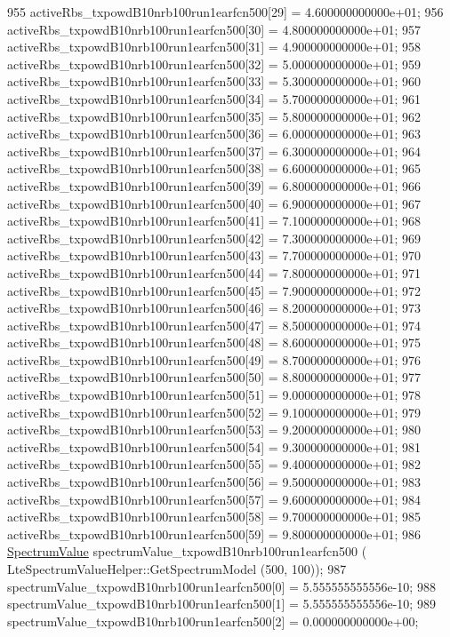 \begin{DoxyCode}
955   activeRbs\_txpowdB10nrb100run1earfcn500[29] = 4.600000000000e+01;
956   activeRbs\_txpowdB10nrb100run1earfcn500[30] = 4.800000000000e+01;
957   activeRbs\_txpowdB10nrb100run1earfcn500[31] = 4.900000000000e+01;
958   activeRbs\_txpowdB10nrb100run1earfcn500[32] = 5.000000000000e+01;
959   activeRbs\_txpowdB10nrb100run1earfcn500[33] = 5.300000000000e+01;
960   activeRbs\_txpowdB10nrb100run1earfcn500[34] = 5.700000000000e+01;
961   activeRbs\_txpowdB10nrb100run1earfcn500[35] = 5.800000000000e+01;
962   activeRbs\_txpowdB10nrb100run1earfcn500[36] = 6.000000000000e+01;
963   activeRbs\_txpowdB10nrb100run1earfcn500[37] = 6.300000000000e+01;
964   activeRbs\_txpowdB10nrb100run1earfcn500[38] = 6.600000000000e+01;
965   activeRbs\_txpowdB10nrb100run1earfcn500[39] = 6.800000000000e+01;
966   activeRbs\_txpowdB10nrb100run1earfcn500[40] = 6.900000000000e+01;
967   activeRbs\_txpowdB10nrb100run1earfcn500[41] = 7.100000000000e+01;
968   activeRbs\_txpowdB10nrb100run1earfcn500[42] = 7.300000000000e+01;
969   activeRbs\_txpowdB10nrb100run1earfcn500[43] = 7.700000000000e+01;
970   activeRbs\_txpowdB10nrb100run1earfcn500[44] = 7.800000000000e+01;
971   activeRbs\_txpowdB10nrb100run1earfcn500[45] = 7.900000000000e+01;
972   activeRbs\_txpowdB10nrb100run1earfcn500[46] = 8.200000000000e+01;
973   activeRbs\_txpowdB10nrb100run1earfcn500[47] = 8.500000000000e+01;
974   activeRbs\_txpowdB10nrb100run1earfcn500[48] = 8.600000000000e+01;
975   activeRbs\_txpowdB10nrb100run1earfcn500[49] = 8.700000000000e+01;
976   activeRbs\_txpowdB10nrb100run1earfcn500[50] = 8.800000000000e+01;
977   activeRbs\_txpowdB10nrb100run1earfcn500[51] = 9.000000000000e+01;
978   activeRbs\_txpowdB10nrb100run1earfcn500[52] = 9.100000000000e+01;
979   activeRbs\_txpowdB10nrb100run1earfcn500[53] = 9.200000000000e+01;
980   activeRbs\_txpowdB10nrb100run1earfcn500[54] = 9.300000000000e+01;
981   activeRbs\_txpowdB10nrb100run1earfcn500[55] = 9.400000000000e+01;
982   activeRbs\_txpowdB10nrb100run1earfcn500[56] = 9.500000000000e+01;
983   activeRbs\_txpowdB10nrb100run1earfcn500[57] = 9.600000000000e+01;
984   activeRbs\_txpowdB10nrb100run1earfcn500[58] = 9.700000000000e+01;
985   activeRbs\_txpowdB10nrb100run1earfcn500[59] = 9.800000000000e+01;
986   \hyperlink{classns3_1_1SpectrumValue}{SpectrumValue} spectrumValue\_txpowdB10nrb100run1earfcn500 (
      LteSpectrumValueHelper::GetSpectrumModel (500, 100));
987   spectrumValue\_txpowdB10nrb100run1earfcn500[0] = 5.555555555556e-10;
988   spectrumValue\_txpowdB10nrb100run1earfcn500[1] = 5.555555555556e-10;
989   spectrumValue\_txpowdB10nrb100run1earfcn500[2] = 0.000000000000e+00;

\end{DoxyCode}
